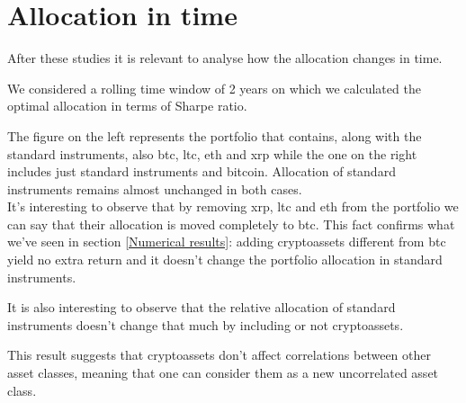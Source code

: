 \section{Allocation in time}
After these studies it is relevant to analyse how the allocation changes in time.

We considered a rolling time window of 2 years on which we calculated the optimal allocation in terms of Sharpe ratio.

\begin{table}[H]
    \centering
    \label{tab:my_label}
\end{table}

The figure on the left represents the portfolio that contains, along with the standard instruments, also btc, ltc, eth and xrp while the one on the right includes just standard instruments and bitcoin. Allocation of standard instruments remains almost unchanged in both cases.\\
It's interesting to observe that by removing xrp, ltc and eth from the portfolio we can say that their allocation is moved completely to btc. This fact confirms what we've seen in section \ref{Numerical results}: adding cryptoassets different from btc yield no extra return and it doesn't change the portfolio allocation in standard instruments.

It is also interesting to observe that the relative allocation of standard instruments doesn't change that much by including or not cryptoassets.
\begin{table}[H]
    \centering
    \label{tab:my_label}
\end{table}

This result suggests that cryptoassets don't affect correlations between other asset classes, meaning that one can consider them as a new uncorrelated asset class.